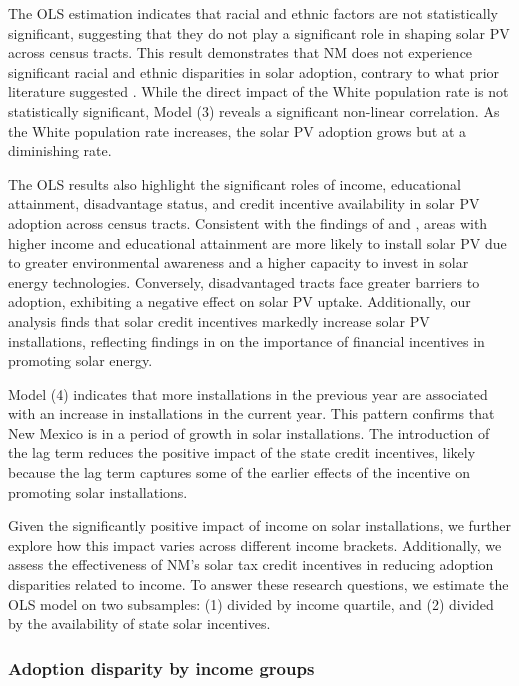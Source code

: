 \documentclass[11pt,twoside,letterpaper]{article}
\begin{document}
The OLS estimation indicates that racial and ethnic factors are not statistically significant, suggesting that they do not play a significant role in shaping solar PV across census tracts. This result demonstrates that NM does not experience significant racial and ethnic disparities in solar adoption, contrary to what prior literature suggested \parencite{gao_solar_2022,darghouth_characterizing_2022}. While the direct impact of the White population rate is not statistically significant, Model (3) reveals a significant non-linear correlation. As the White population rate increases, the solar PV adoption grows but at a diminishing rate.


The OLS results also highlight the significant roles of income, educational attainment, disadvantage status, and credit incentive availability in solar PV adoption across census tracts. Consistent with the findings of \textcite{oshaughnessy_income-targeted_2021} and \textcite{darghouth_characterizing_2022}, areas with higher income and educational attainment are more likely to install solar PV due to greater environmental awareness and a higher capacity to invest in solar energy technologies. Conversely, disadvantaged tracts face greater barriers to adoption, exhibiting a negative effect on solar PV uptake. Additionally, our analysis finds that solar credit incentives markedly increase solar PV installations, reflecting findings in \textcite{borenstein_private_2017} on the importance of financial incentives in promoting solar energy. 

Model (4) indicates that more installations in the previous year are associated with an increase in installations in the current year. This pattern confirms that New Mexico is in a period of growth in solar installations. The introduction of the lag term reduces the positive impact of the state credit incentives, likely because the lag term captures some of the earlier effects of the incentive on promoting solar installations. 

Given the significantly positive impact of income on solar installations, we further explore how this impact varies across different income brackets. Additionally, we assess the effectiveness of NM's solar tax credit incentives in reducing adoption disparities related to income. To answer these research questions, we estimate the OLS model on two subsamples: (1) divided by income quartile, and (2) divided by the availability of state solar incentives.

\subsubsection{Adoption disparity by income groups}
\end{document}

